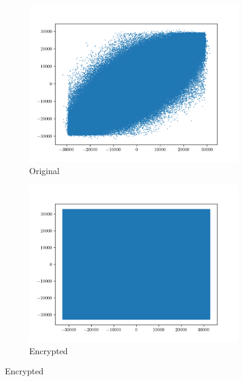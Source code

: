 \documentclass[a4paper]{cas-sc}
\begin{document}
\begin{figure}[pos=h]
    \begin{subfigure}[h]{0.3\textwidth}
        \begin{center}
            \includegraphics[width=\textwidth]{embedded2Correlation.png}
            \caption{Original}
            \label{fig:embedded2Correlation}
        \end{center}
    \end{subfigure}
    \begin{subfigure}[h]{0.3\textwidth}
        \begin{center}
            \includegraphics[width=\textwidth]{encrypted2Correlation.png}
            \caption{Encrypted}
            \label{fig:encrypted2Correlation}

\end{center}
\end{subfigure}
\end{figure}
\end{document}
